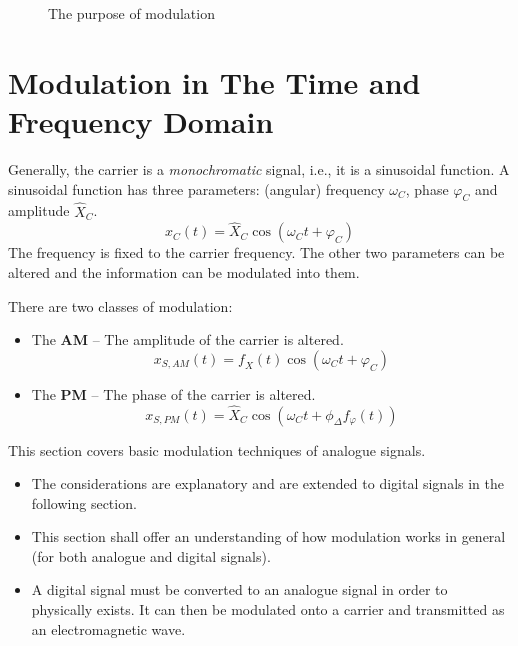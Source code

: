 \begin{refsection}
\begin{figure}[H]
	\centering
	\caption{The purpose of modulation}
\end{figure}

\section{Modulation in The Time and Frequency Domain}

Generally, the carrier is a \emph{monochromatic} signal, i.e., it is a sinusoidal function. A sinusoidal function has three parameters: (angular) frequency $\omega_C$, phase $\varphi_C$ and amplitude $\hat{X}_C$.
\begin{equation}
	x_C(t) = \hat{X}_C \cos\left(\omega_C t + \varphi_C\right)
	\label{eq:ch05:carrier_timedomain}
\end{equation}
The frequency is fixed to the carrier frequency. The other two parameters can be altered and the information can be modulated into them.

There are two classes of modulation:
\begin{itemize}
	\item The  \textbf{\acf{AM}} -- The amplitude of the carrier is altered.
	\begin{equation}
		x_{S,AM}(t) = f_{\hat{X}}(t) \cos\left(\omega_C t + \varphi_C\right)
	\end{equation}
	\item The  \textbf{\acf{PM}} -- The phase of the carrier is altered.
	\begin{equation}
		x_{S,PM}(t) = \hat{X}_C \cos\left(\omega_C t + \phi_{\Delta} f_{\varphi}(t)\right)
		\label{eq:ch05:pm_general}
	\end{equation}
\end{itemize}

This section covers basic modulation techniques of analogue signals.
\begin{itemize}
	\item The considerations are explanatory and are extended to digital signals in the following section.
	\item This section shall offer an understanding of how modulation works in general (for both analogue and digital signals).
	\item A digital signal must be converted to an analogue signal in order to physically exists. It can then be modulated onto a carrier and transmitted as an electromagnetic wave.
\end{itemize}


\end{refsection}
